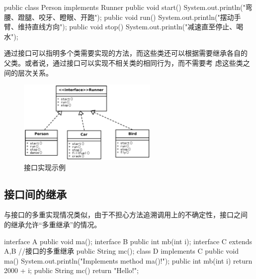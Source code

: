 
\begin{javaCode}
  public class Person implements Runner {
    public void start() {
      System.out.println("弯腰、蹬腿、咬牙、瞪眼、开跑");
    }
    public void run(){
      System.out.println("摆动手臂、维持直线方向");
    }
    public void stop(){
      System.out.println("减速直至停止、喝水");
    }
  }
\end{javaCode}

通过接口可以指明多个类需要实现的方法，而这些类还可以根据需要继承各自的
父类。或者说，{\Red\kai 通过接口可以实现不相关类的相同行为，而不需要考
  虑这些类之间的层次关系。}

\begin{figure}[htb]
\centering
\includegraphics[width=0.6\textwidth]{images/Advanced-class-features/fig-interface-implement-sample.pdf}
\caption{接口实现示例}
\label{fig:interface-implement-sample}
\end{figure}



\subsection{接口间的继承}

与接口的多重实现情况类似，由于不担心方法追溯调用上的不确定性，接口之间
的继承允许“多重继承”的情况。

\begin{javaCode}
  interface A {
    public void ma();
  }
  interface B {
    public int mb(int i);
  }
  interface C extends A,B {  //接口的多重继承
    public String mc();
  }
  class D implements C {
    public void ma() {
      System.out.println("Implements method ma()!");
    }
    public int mb(int i) {
      return 2000 + i;
    }
    public String mc() {
      return "Hello!";
    }
  }
\end{javaCode}

